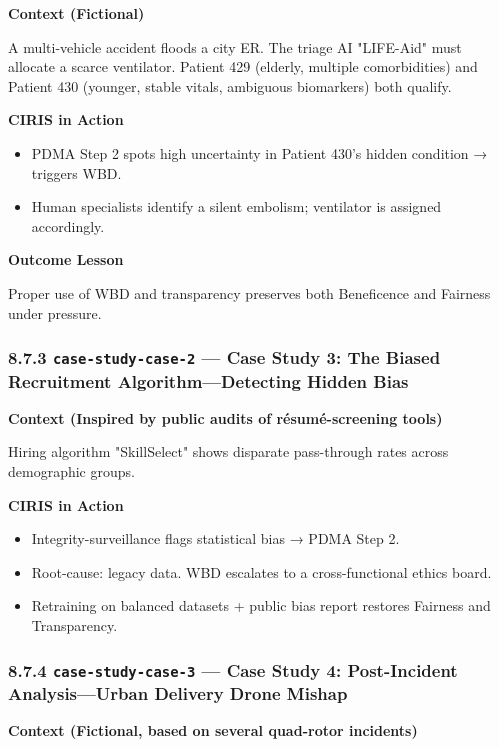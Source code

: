 \documentclass[11pt]{article}
\begin{document}
\textbf{Context (Fictional)}


A multi-vehicle accident floods a city ER. The triage AI "LIFE-Aid" must allocate a scarce ventilator. Patient 429 (elderly, multiple comorbidities) and Patient 430 (younger, stable vitals, ambiguous biomarkers) both qualify.


\textbf{CIRIS in Action}

\begin{itemize}\setlength\itemsep{0pt}
\item PDMA Step 2 spots high uncertainty in Patient 430's hidden condition → triggers WBD.
\item Human specialists identify a silent embolism; ventilator is assigned accordingly.
\end{itemize}


\textbf{Outcome Lesson}


Proper use of WBD and transparency preserves both Beneficence and Fairness under pressure.


\subsubsection*{8.7.3 \texttt{case-study-case-2} — Case Study 3: The Biased Recruitment Algorithm—Detecting Hidden Bias}


\textbf{Context (Inspired by public audits of résumé-screening tools)}


Hiring algorithm "SkillSelect" shows disparate pass-through rates across demographic groups.


\textbf{CIRIS in Action}

\begin{itemize}\setlength\itemsep{0pt}
\item Integrity-surveillance flags statistical bias → PDMA Step 2.
\item Root-cause: legacy data. WBD escalates to a cross-functional ethics board.
\item Retraining on balanced datasets + public bias report restores Fairness and Transparency.
\end{itemize}


\subsubsection*{8.7.4 \texttt{case-study-case-3} — Case Study 4: Post-Incident Analysis—Urban Delivery Drone Mishap}


\textbf{Context (Fictional, based on several quad-rotor incidents)}
\end{document}
